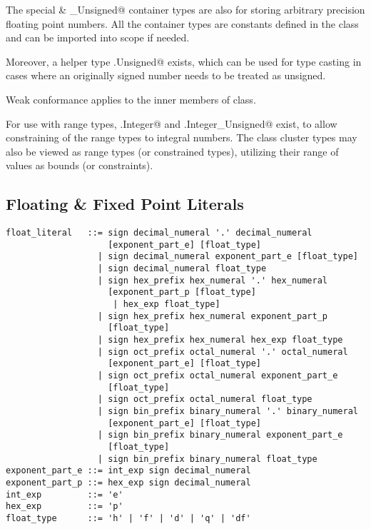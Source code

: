 The special \lstinline@Decimal@ \& \lstinline@Decimal_Unsigned@ container types are also for storing arbitrary precision floating point numbers. All the container types are constants defined in the \lstinline@Number@ class and can be imported into scope if needed. 

Moreover, a helper type \lstinline@Number.Unsigned@ exists, which can be used for type casting in cases where an originally signed number needs to be treated as unsigned. 

Weak conformance applies to the inner members of \lstinline@Number@ class. 

For use with range types, \lstinline@Number.Integer@ and \lstinline@Number.Integer_Unsigned@ exist, to allow constraining of the range types to integral numbers. The class cluster types may also be viewed as range types (or constrained types), utilizing their range of values as bounds (or constraints). 






\subsection{Floating \& Fixed Point Literals}
\label{sec:floatliterals}
\label{sec:fixedpointliterals}

\syntax\begin{lstlisting}
float_literal   ::= sign decimal_numeral '.' decimal_numeral
                    [exponent_part_e] [float_type]
                  | sign decimal_numeral exponent_part_e [float_type]
                  | sign decimal_numeral float_type
                  | sign hex_prefix hex_numeral '.' hex_numeral 
                    [exponent_part_p [float_type] 
                     | hex_exp float_type]
                  | sign hex_prefix hex_numeral exponent_part_p 
                    [float_type]
                  | sign hex_prefix hex_numeral hex_exp float_type
                  | sign oct_prefix octal_numeral '.' octal_numeral 
                    [exponent_part_e] [float_type]
                  | sign oct_prefix octal_numeral exponent_part_e 
                    [float_type]
                  | sign oct_prefix octal_numeral float_type
                  | sign bin_prefix binary_numeral '.' binary_numeral 
                    [exponent_part_e] [float_type]
                  | sign bin_prefix binary_numeral exponent_part_e 
                    [float_type]
                  | sign bin_prefix binary_numeral float_type
exponent_part_e ::= int_exp sign decimal_numeral
exponent_part_p ::= hex_exp sign decimal_numeral
int_exp         ::= 'e'
hex_exp         ::= 'p'
float_type      ::= 'h' | 'f' | 'd' | 'q' | 'df'
\end{lstlisting}

